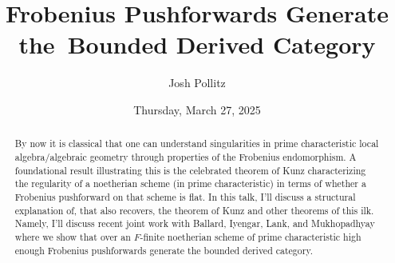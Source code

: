 \documentclass{UAmathtalk}
\author{Josh Pollitz}
\title{Frobenius Pushforwards Generate the~Bounded Derived Category}
\date{Thursday, March 27, 2025}
\begin{document}
\maketitle

\begin{abstract}
By now it is classical that one can understand singularities in prime characteristic local algebra/algebraic geometry through properties of the Frobenius endomorphism. A foundational result illustrating this is the celebrated theorem of Kunz characterizing the regularity of a noetherian scheme (in prime characteristic) in terms of whether a Frobenius pushforward on that scheme is flat. In this talk, I'll discuss a structural explanation of, that also recovers, the theorem of Kunz and other theorems of this ilk. Namely, I’ll discuss recent joint work with Ballard, Iyengar, Lank, and Mukhopadhyay where we show that over an $F$-finite noetherian scheme of prime characteristic high enough Frobenius pushforwards generate the bounded derived category.\linebreak
\end{abstract}
\end{document}
